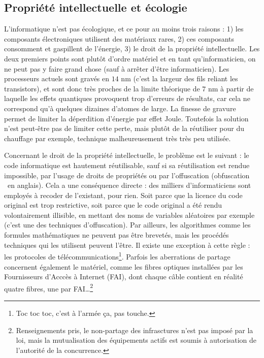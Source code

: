 \documentclass[10pt]{article}
\begin{document}
\subsection{Propriété intellectuelle et écologie}

L'informatique n'est pas écologique, et ce pour au moins trois raisons : 1) les composants électroniques utilisent des matériaux rares,
2) ces composants consomment et gaspillent de l'énergie, 3) le droit de la propriété intellectuelle.
Les deux premiers points sont plutôt d'ordre matériel et en tant qu'informaticien, on ne peut pas y faire grand chose (sauf à arrêter d'être informaticien).
Les processeurs actuels sont gravés en $14$ nm (c'est la largeur des fils reliant les transistors), et sont donc très proches
de la limite théorique de $7$ nm à partir de laquelle les effets quantiques provoquent trop d'erreurs de résultats, car cela ne correspond
qu'à quelques dizaines d'atomes de large. La finesse de gravure permet
de limiter la déperdition d'énergie par effet Joule. Toutefois la solution n'est peut-être pas de limiter cette perte, mais plutôt de la réutiliser
pour du chauffage par exemple, technique malheureusement très très peu utilisée.


Concernant le droit de la propriété intellectuelle, le problème est le suivant : le code informatique est hautement réutilisable,
sauf si sa réutilisation est rendue impossible, par l'usage de droits de propriétés ou par l'offuscation (\og obfuscation \fg~en anglais).
Cela a une conséquence directe : des milliers d'informaticiens sont employés à recoder de l'existant, pour rien. Soit parce que la
licence du code original est trop restrictive, soit parce que le code original a été rendu volontairement illisible, en mettant
des noms de variables aléatoires par exemple (c'est une des techniques d'offuscation). Par ailleurs, les algorithmes comme
les formules mathématiques ne peuvent pas être brevetés, mais les procédés techniques qui les utilisent peuvent l'être. Il existe
une exception à cette règle : les protocoles de télécommunications\footnote{Toc toc toc, c'est à l'armée ça, pas touche.}.
Parfois les aberrations de partage concernent également le matériel, comme les fibres optiques installées par les Fournisseurs
d'Acccès à Internet (FAI), dont chaque câble contient en réalité quatre fibres, une par FAI\ldots \footnote{
  Renseignements pris, le non-partage des infrasctures n'est pas imposé par la loi, mais la mutualisation des équipements
  actifs est soumis à autorisation de l'autorité de la concurrence.
}
\end{document}
